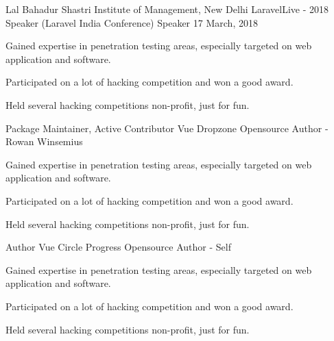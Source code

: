 

\begin{cventries}

  \cventry
    {Lal Bahadur Shastri Institute of Management, New Delhi} %
    {LaravelLive - 2018 Speaker (Laravel India Conference)} %
    {Speaker} %
    {17 March, 2018} %
    {
      \begin{cvitems} %
        \item {Gained expertise in penetration testing areas, especially targeted on web application and software.}
        \item {Participated on a lot of hacking competition and won a good award.}
        \item {Held several hacking competitions non-profit, just for fun.}
      \end{cvitems}
    }
  \cventry
    {Package Maintainer, Active Contributor} %
    {Vue Dropzone} %
    {Opensource} %
    {Author - Rowan Winsemius} %
    {
      \begin{cvitems} %
        \item {Gained expertise in penetration testing areas, especially targeted on web application and software.}
        \item {Participated on a lot of hacking competition and won a good award.}
        \item {Held several hacking competitions non-profit, just for fun.}
      \end{cvitems}
    }

  \cventry
    {Author} %
    {Vue Circle Progress} %
    {Opensource} %
    {Author - Self} %
    {
      \begin{cvitems} %
        \item {Gained expertise in penetration testing areas, especially targeted on web application and software.}
        \item {Participated on a lot of hacking competition and won a good award.}
        \item {Held several hacking competitions non-profit, just for fun.}
      \end{cvitems}
    }


\end{cventries}

